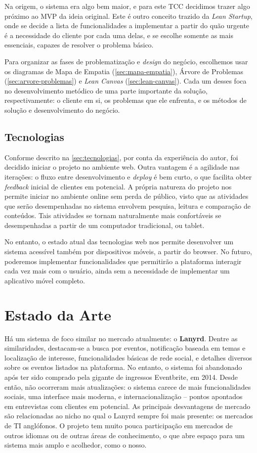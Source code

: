 \documentclass[12pt,a4paper,twoside,hyphens,english,brazil]{abntex2}
\begin{document}
Na origem, o sistema era algo bem maior, e para este TCC decidimos trazer algo próximo ao MVP da ideia original. Este é outro conceito trazido da \emph{Lean Startup}, onde se decide a lista de funcionalidades a implementar a partir do quão urgente é a necessidade do cliente por cada uma delas, e se escolhe somente as mais essenciais, capazes de resolver o problema básico.

Para organizar as fases de problematização e \emph{design} do negócio, escolhemos usar os diagramas de Mapa de Empatia (\autoref{sec:mapa-empatia}), Árvore de Problemas (\autoref{sec:arvore-problemas}) e \emph{Lean Canvas} (\autoref{sec:lean-canvas}). Cada um desses foca no desenvolvimento metódico de uma parte importante da solução, respectivamente: o cliente em si, os problemas que ele enfrenta, e os métodos de solução e desenvolvimento do negócio.

\subsection{Tecnologias}
Conforme descrito na \autoref{sec:tecnologias}, por conta da experiência do autor, foi decidido iniciar o projeto no ambiente web. Outra vantagem é a agilidade nas iterações: o fluxo entre desenvolvimento e \emph{deploy} é bem curto, o que facilita obter \emph{feedback} inicial de clientes em potencial. A própria natureza do projeto nos permite iniciar no ambiente online sem perda de público, visto que as atividades que serão desempenhadas no sistema envolvem pesquisa, leitura e comparação de conteúdos. Tais atividades se tornam naturalmente mais confortáveis se desempenhadas a partir de um computador tradicional, ou tablet.

No entanto, o estado atual das tecnologias web nos permite desenvolver um sistema acessível também por dispositivos móveis, a partir do browser. No futuro, poderemos implementar funcionalidades que permitirão a plataforma interagir cada vez mais com o usuário, ainda sem a necessidade de implementar um aplicativo móvel completo.\cite{bitbucket-mobile-milestone}

\section{Estado da Arte}
Há um sistema de foco similar no mercado atualmente: o \textbf{Lanyrd}. Dentre as similaridades, destacam-se a busca por eventos, notificação baseada em temas e localização de interesse, funcionalidades básicas de rede social, e detalhes diversos sobre os eventos listados na plataforma. No entanto, o sistema foi abandonado após ter sido comprado pela gigante de ingressos Eventbrite, em 2014.\cite{lanyrd-abandonado} Desde então, não ocorreram mais atualizações: o sistema carece de mais funcionalidades sociais, uma interface mais moderna, e internacionalização -- pontos apontados em entrevistas com clientes em potencial. As principais desvantagens de mercado são relacionadas ao nicho no qual o Lanyrd sempre foi mais presente: os mercados de TI anglófonos. O projeto tem muito pouca participação em mercados de outros idiomas ou de outras áreas de conhecimento, o que abre espaço para um sistema mais amplo e acolhedor, como o nosso.
\end{document}
